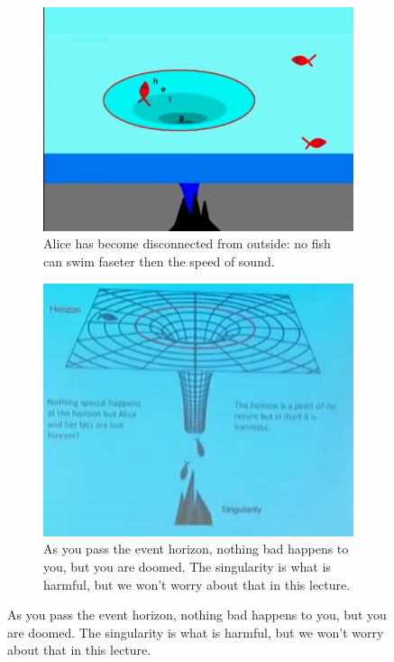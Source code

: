 \documentclass[]{article}
\begin{document}
{\begin{appendices}
	\begin{figure}[H]
		\caption{William Unruh's analogy for a black hole}
		\begin{subfigure}[t]{0.45\textwidth}
			\caption{Alice has become disconnected from outside: no fish can swim faseter then the speed of sound.}
			\includegraphics[width=\textwidth]{wh-alice}
		\end{subfigure}
		\begin{subfigure}[t]{0.45\textwidth}
			\caption{As you pass the event horizon, nothing bad happens to you, but you are doomed. The singularity is what is harmful, but we won't worry about that in this lecture.}
			\includegraphics[width=\textwidth]{wh-black-hole}
		\end{subfigure}
	\end{figure} 
	

\end{appendices}}
\end{document}
